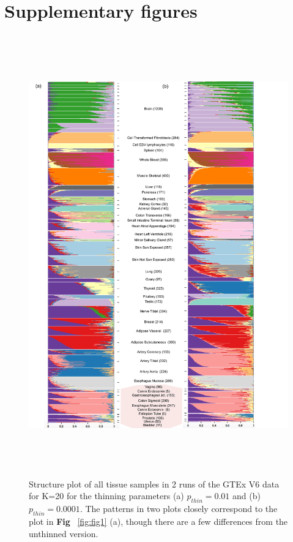 \section{Supplementary figures}
 \begin{figure}[ht]
 \centering
\includegraphics[height=7.5in, width=6.5in]{../plots/gtex-figures/gtex_thinned_04_25_2016.pdf}
    \caption{Structure plot of all tissue samples in 2 runs of the GTEx V6 data for  K=20 for the thinning parameters (a) $p_{thin}=0.01$ and (b) $p_{thin}=0.0001$. The patterns in two plots closely correspond to the plot in \textbf{Fig} ~\ref{fig:fig1} (a), though there are a few differences from the unthinned version. }
 \label{fig:figS1}
    \end{figure}

